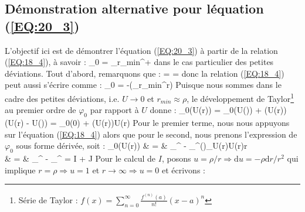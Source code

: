 \subsection{D\'emonstration alternative pour l\'equation (\ref{EQ:20_3})}

L'objectif ici est de d\'emontrer l'\'equation (\ref{EQ:20_3}) \`a partir de la relation (\ref{EQ:18_4}), \`a savoir :
\be
	\varphi_{0} = \int_{r_{min}}^{+\infty}{}
\ee
dans le cas particulier des petites d\'eviations. Tout d'abord, remarquons que :
\be
	 =  = 
\ee
donc la relation (\ref{EQ:18_4}) peut aussi s'\'ecrire comme :
\be
	\varphi_{0} = -\dfrac{\partial}{\partial \rho}\left(\int_{r_{min}}^{\infty}r\right)
\ee
Puisque nous sommes dans le cadre des petites d\'eviations, i.e. $U \rightarrow 0$ et $r_{min} \approx \rho$, le d\'eveloppement de Taylor\footnote{S\'erie de Taylor : $f(x) = \sum_{n=0}^{\infty}\frac{f^{(n)}(a)}{n!}(x - a)^{n}$} au premier ordre de $\varphi_{0}$ par rapport \`a $U$ donne :
\be
	\varphi_{0}(U(r)) = \varphi_{0}(U(\infty)) + (U(r))\cdot(U(r) - U(\infty))  = \varphi_{0}(0) + (U(r))\cdot U(r)
\ee
Pour le premier terme, nous nous appuyons sur l'\'equation (\ref{EQ:18_4}) alors que pour le second, nous prenons l'expression de $\varphi_{0}$ sous forme d\'eriv\'ee, soit :
\bea
	\varphi_{0}(U(r)) & = & \int_{\rho}^{\infty} - \dfrac{\partial}{\partial\rho}\int_{\rho}^{\infty}\left(\right)_{U(r)}\cdot U(r)r \nonumber \\
	& = & \int_{\rho}^{\infty} - \int_{\rho}^{\infty} = I + \dfrac{\partial}{\partial\rho}J
\eea
Pour le calcul de $I$, posons $u = \rho/r \Rightarrow \mathrm{d}u = -\rho\mathrm{d}r/r^{2}$ qui implique $r = \rho \Rightarrow u = 1$ et $r \rightarrow \infty \Rightarrow u = 0$ et \'ecrivons :
